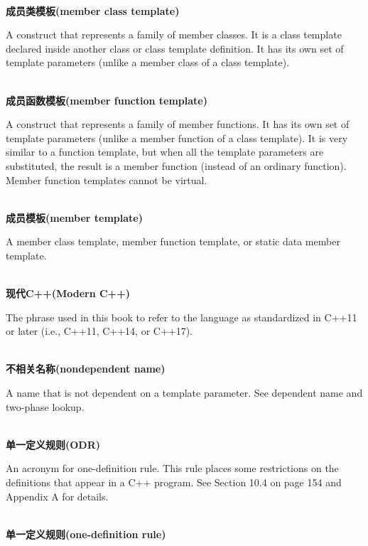 \hspace*{\fill} \\ %
\noindent
\textbf{成员类模板(member class template)}

A construct that represents a family of member classes. It is a class template declared inside another class or class template definition. It has its own set of template parameters (unlike a member class of a class template).

\hspace*{\fill} \\ %
\noindent
\textbf{成员函数模板(member function template)}

A construct that represents a family of member functions. It has its own set of template parameters (unlike a member function of a class template). It is very similar to a function template, but when all the template parameters are substituted, the result is a member function (instead of an ordinary function). Member function templates cannot be virtual.

\hspace*{\fill} \\ %
\noindent
\textbf{成员模板(member template)}

A member class template, member function template, or static data member template.

\hspace*{\fill} \\ %
\noindent
\textbf{现代C++(Modern C++)}

The phrase used in this book to refer to the language as standardized in C++11 or later (i.e., C++11, C++14, or C++17).

\hspace*{\fill} \\ %
\noindent
\textbf{不相关名称(nondependent name)}

A name that is not dependent on a template parameter. See dependent name and two-phase lookup.

\hspace*{\fill} \\ %
\noindent
\textbf{单一定义规则(ODR)}

An acronym for one-definition rule. This rule places some restrictions on the definitions that appear in a C++ program. See Section 10.4 on page 154 and Appendix A for details.

\hspace*{\fill} \\ %
\noindent
\textbf{单一定义规则(one-definition rule)}


